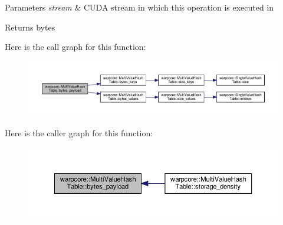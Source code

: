 \begin{DoxyParams}{Parameters}
{\em stream} & C\+U\+DA stream in which this operation is executed in \\
\hline
\end{DoxyParams}
\begin{DoxyReturn}{Returns}
bytes 
\end{DoxyReturn}
Here is the call graph for this function\+:
\nopagebreak
\begin{figure}[H]
\begin{center}
\leavevmode
\includegraphics[width=350pt]{classwarpcore_1_1MultiValueHashTable_a977baa47c1b37eeeb591dd13d76d184a_cgraph}
\end{center}
\end{figure}
Here is the caller graph for this function\+:
\nopagebreak
\begin{figure}[H]
\begin{center}
\leavevmode
\includegraphics[width=350pt]{classwarpcore_1_1MultiValueHashTable_a977baa47c1b37eeeb591dd13d76d184a_icgraph}
\end{center}
\end{figure}
\mbox{\label{classwarpcore_1_1MultiValueHashTable_a99e15b4fe9bfa63f8b1c823a3c030971}} 
